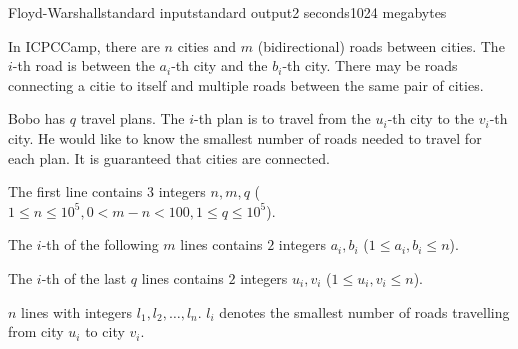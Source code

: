 \begin{problem}{Floyd-Warshall}{standard input}{standard output}{2 seconds}{1024 megabytes}

In ICPCCamp, there are $n$ cities and $m$ (bidirectional) roads between cities.
The $i$-th road is between the $a_i$-th city and the $b_i$-th city.
There may be roads connecting a citie to itself and multiple roads between the same pair of cities.

Bobo has $q$ travel plans. 
The $i$-th plan is to travel from the $u_i$-th city to the $v_i$-th city.
He would like to know the smallest number of roads needed to travel for each plan.
It is guaranteed that cities are connected.

\InputFile
The first line contains $3$ integers $n, m, q$ ($1 \leq n \leq 10^5, 0 < m - n < 100, 1 \leq q \leq 10^5$). 

The $i$-th of the following $m$ lines contains $2$ integers $a_i, b_i$ ($1 \leq a_i, b_i \leq n$). 

The $i$-th of the last $q$ lines contains $2$ integers $u_i, v_i$ ($1 \leq u_i, v_i \leq n$). 

\OutputFile
$n$ lines with integers $l_1, l_2, \dots, l_n$. 
$l_i$ denotes the smallest number of roads travelling from city $u_i$ to city $v_i$. 

\Examples

\begin{example}
%
%
\end{example}

\end{problem}

